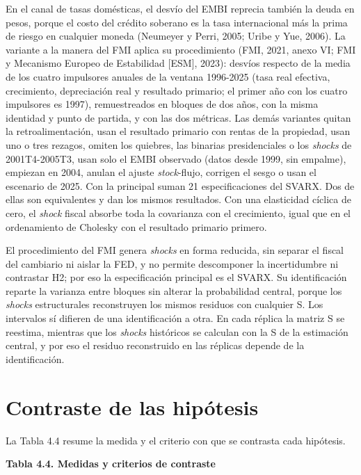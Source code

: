 En el canal de tasas domésticas, el desvío del EMBI reprecia también la
deuda en pesos, porque el costo del crédito soberano es la tasa
internacional más la prima de riesgo en cualquier moneda (Neumeyer y
Perri, 2005; Uribe y Yue, 2006). La variante a la manera del FMI aplica
su procedimiento (FMI, 2021, anexo VI; FMI y Mecanismo Europeo de
Estabilidad {[}ESM{]}, 2023): desvíos respecto de la media de los cuatro
impulsores anuales de la ventana 1996-2025 (tasa real efectiva,
crecimiento, depreciación real y resultado primario; el primer año con
los cuatro impulsores es 1997), remuestreados en bloques de dos años,
con la misma identidad y punto de partida, y con las dos métricas. Las
demás variantes quitan la retroalimentación, usan el resultado primario
con rentas de la propiedad, usan uno o tres rezagos, omiten los
quiebres, las binarias presidenciales o los \emph{shocks} de
2001T4-2005T3, usan solo el EMBI observado (datos desde 1999, sin
empalme), empiezan en 2004, anulan el ajuste \emph{stock}-flujo,
corrigen el sesgo o usan el escenario de 2025. Con la principal suman 21
especificaciones del SVARX. Dos de ellas son equivalentes y dan los
mismos resultados. Con una elasticidad cíclica de cero, el \emph{shock}
fiscal absorbe toda la covarianza con el crecimiento, igual que en el
ordenamiento de Cholesky con el resultado primario primero.

El procedimiento del FMI genera \emph{shocks} en forma reducida, sin
separar el fiscal del cambiario ni aislar la FED, y no permite
descomponer la incertidumbre ni contrastar H2; por eso la especificación
principal es el SVARX. Su identificación reparte la varianza entre
bloques sin alterar la probabilidad central, porque los \emph{shocks}
estructurales reconstruyen los mismos residuos con cualquier S. Los
intervalos sí difieren de una identificación a otra. En cada réplica la
matriz S se reestima, mientras que los \emph{shocks} históricos se
calculan con la S de la estimación central, y por eso el residuo
reconstruido en las réplicas depende de la identificación.

\section{Contraste de las hipótesis}

La Tabla 4.4 resume la medida y el criterio con que se contrasta cada
hipótesis.

\textbf{Tabla 4.4. Medidas y criterios de contraste}

